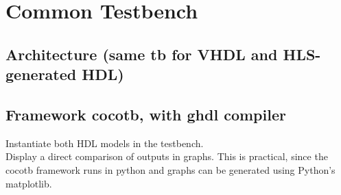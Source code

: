 \section{Common Testbench}
  \subsection{Architecture (same tb for VHDL and HLS-generated HDL)}
  \subsection{Framework cocotb, with ghdl compiler}
  Instantiate both HDL models in the testbench.\\
  Display a direct comparison of outputs in graphs. This is practical, since the cocotb framework runs in python and graphs can be generated using Python's matplotlib.

